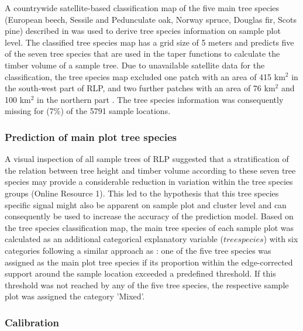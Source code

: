 A countrywide satellite-based classification map of the five main tree species (European beech, Sessile and Pedunculate oak, Norway spruce, Douglas fir, Scots pine) described in \citet{stoffels2015} was used to derive tree species information on sample plot level. The classified tree species map has a grid size of 5 meters and predicts five of the seven tree species that are used in the \bwi{} taper functions \citep{kublin2013} to calculate the timber volume of a sample tree. Due to unavailable satellite data for the classification, the tree species map excluded one patch with an area of 415 km$^2$ in the south-west part of RLP, and two further patches with an area of 76 km$^2$ and 100 km$^2$ in the northern part \citep{stoffels2015}. The tree species information was consequently missing for  (7\%) of the 5791 sample locations.

\subsubsection*{Prediction of main plot tree species}

A visual inspection of all \bwi{} sample trees of RLP suggested that a stratification of the relation between tree height and timber volume according to these seven tree species may provide a considerable reduction in variation within the tree species groups (Online Resource 1). This led to the hypothesis that this tree species specific signal might also be apparent on sample plot and cluster level and can consequently be used to increase the accuracy of the prediction model. Based on the tree species classification map, the main tree species of each sample plot was calculated as an additional categorical explanatory variable ($treespecies$) with six categories following a similar approach as \citet{latifi2012}: one of the five tree species was assigned as the main plot tree species if its proportion within the edge-corrected support around the sample location exceeded a predefined threshold. If this threshold was not reached by any of the five tree species, the respective sample plot was assigned the category 'Mixed'. 
\par


\subsubsection*{Calibration}

